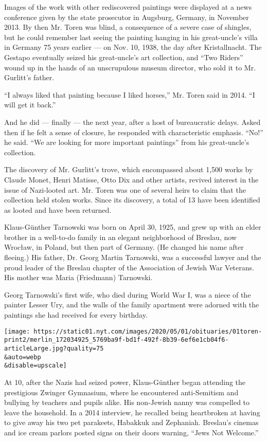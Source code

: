 Images of the work with other rediscovered paintings were displayed at a
news conference given by the state prosecutor in Augsburg, Germany, in
November 2013. By then Mr. Toren was blind, a consequence of a severe
case of shingles, but he could remember last seeing the painting hanging
in his great-uncle's villa in Germany 75 years earlier --- on Nov. 10,
1938, the day after Kristallnacht. The Gestapo eventually seized his
great-uncle's art collection, and ``Two Riders'' wound up in the hands
of an unscrupulous museum director, who sold it to Mr. Gurlitt's father.

``I always liked that painting because I liked horses,'' Mr. Toren said
in 2014. ``I will get it back.''

And he did --- finally --- the next year, after a host of bureaucratic
delays. Asked then if he felt a sense of closure, he responded with
characteristic emphasis. ``No!'' he said. ``We are looking for more
important paintings'' from his great-uncle's collection.

The discovery of Mr. Gurlitt's trove, which encompassed about 1,500
works by Claude Monet, Henri Matisse, Otto Dix and other artists,
revived interest in the issue of Nazi-looted art. Mr. Toren was one of
several heirs to claim that the collection held stolen works. Since its
discovery, a total of 13 have been identified as looted and have been
returned.

Klaus-Günther Tarnowski was born on April 30, 1925, and grew up with an
elder brother in a well-to-do family in an elegant neighborhood of
Breslau, now Wrocław, in Poland, but then part of Germany. (He changed
his name after fleeing.) His father, Dr. Georg Martin Tarnowski, was a
successful lawyer and the proud leader of the Breslau chapter of the
Association of Jewish War Veterans. His mother was Maria (Friedmann)
Tarnowski.

Georg Tarnowski's first wife, who died during World War I, was a niece
of the painter Lesser Ury, and the walls of the family apartment were
adorned with the paintings she had received for every birthday.

\texttt{[image: https://static01.nyt.com/images/2020/05/01/obituaries/01toren-print2/merlin\_172034925\_5769ba9f-bd1f-492f-8b39-6ef6e1cb04f6-articleLarge.jpg?quality=75\\\&auto=webp\\\&disable=upscale]}

At 10, after the Nazis had seized power, Klaus-Günther began attending
the prestigious Zwinger Gymnasium, where he encountered anti-Semitism
and bullying by teachers and pupils alike. His non-Jewish nanny was
compelled to leave the household. In a 2014 interview, he recalled being
heartbroken at having to give away his two pet parakeets, Habakkuk and
Zephaniah. Breslau's cinemas and ice cream parlors posted signs on their
doors warning, ``Jews Not Welcome.''

